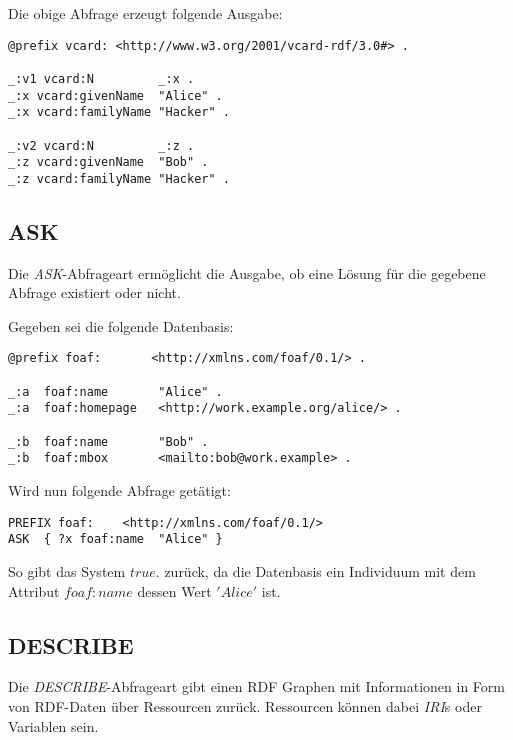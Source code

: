 Die obige Abfrage erzeugt folgende Ausgabe:
\begin{lstlisting}
@prefix vcard: <http://www.w3.org/2001/vcard-rdf/3.0#> .

_:v1 vcard:N         _:x .
_:x vcard:givenName  "Alice" .
_:x vcard:familyName "Hacker" .

_:v2 vcard:N         _:z .
_:z vcard:givenName  "Bob" .
_:z vcard:familyName "Hacker" .
\end{lstlisting}

\subsection{ASK}
\label{subsec:sparql_abfragearten_ask}
Die \textit{ASK}-Abfrageart ermöglicht die Ausgabe, ob eine Lösung für die gegebene Abfrage existiert oder nicht.

Gegeben sei die folgende Datenbasis:
\lstset{language=XML}
\begin{lstlisting}
@prefix foaf:       <http://xmlns.com/foaf/0.1/> .

_:a  foaf:name       "Alice" .
_:a  foaf:homepage   <http://work.example.org/alice/> .

_:b  foaf:name       "Bob" .
_:b  foaf:mbox       <mailto:bob@work.example> .
\end{lstlisting}

Wird nun folgende Abfrage getätigt:
\lstset{language=XML}
\begin{lstlisting}
PREFIX foaf:    <http://xmlns.com/foaf/0.1/>
ASK  { ?x foaf:name  "Alice" }
\end{lstlisting}
So gibt das System $true.$ zurück, da die Datenbasis ein Individuum mit dem Attribut $foaf:name$ dessen Wert $'Alice'$ ist.

\subsection{DESCRIBE}
\label{subsec:sparql_abfragearten_describe}
Die \textit{DESCRIBE}-Abfrageart gibt einen RDF Graphen mit Informationen in Form von RDF-Daten über Ressourcen zurück. Ressourcen können dabei \textit{IRI}s oder Variablen sein.

